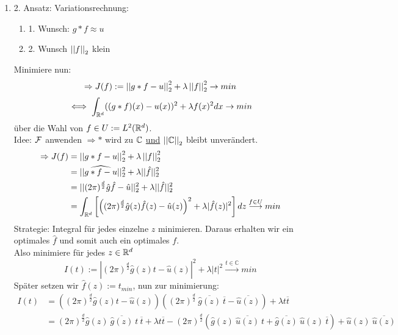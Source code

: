 \begin{enumerate}
\begin{minipage}[c]{0.4\textwidth}
\begin{center}
            \end{center}
        \end{minipage}
        \item[] 2. Ansatz: Variationsrechnung:
            \begin{enumerate}
                \item[] 1. Wunsch: $g *f \approx u$
                \item[] 2. Wunsch $\left\lvert \left\lvert f \right\rvert \right\rvert_2$ klein
            \end{enumerate}
            Minimiere nun:
            \[\Rightarrow J(f) := \left\lvert \left\lvert g * f - u \right\rvert \right\rvert_2^2 + \lambda \left\lvert \left\lvert f \right\rvert \right\rvert_2^2 \to min\]
            \[\iff \int_{\mathbb{R}^d} ((g*f)(x) - u(x))^2 + \lambda f(x)^2 dx \to min\]
            über die Wahl von $f \in U:= L^2(\mathbb{R}^d)$.\\
            Idee: $\mathcal{F}$ anwenden $\Rightarrow *$ wird zu $\mathbb{C}$ \underline{und} $\left\lvert \left\lvert \mathbb{C} \right\rvert \right\rvert_2$ bleibt unverändert.
            \begin{align*}
                \Rightarrow J(f)&=\left\lvert \left\lvert g*f-u \right\rvert \right\rvert_2^2 + \lambda\left\lvert \left\lvert f \right\rvert \right\rvert_2^2\\
                &=||\widehat{g*f-u}||_2^2 + \lambda ||\hat f||_2^2\\
                &=||(2 \pi)^\frac{d}{2} \hat g \hat f -\hat u||_2^2 + \lambda||\hat f||_2^2\\
                &=\int_{\mathbb{R}^d}\left[ \left((2 \pi)^\frac{d}{2} \hat g(z) \hat f(z) - \hat u(z)\right)^2 + \lambda |\hat f(z)|^2 \right] dz \overset{f \in U}{\longrightarrow} min
            \end{align*}
        Strategie: Integral für jedes einzelne $z$ minimieren. Daraus erhalten wir ein optimales $\hat f$ und somit auch ein optimales $f$.\\
        Also minimiere für jedes $z \in \mathbb{R}^d$
        \[I(t):=|(2 \pi)^\frac{d}{2} \hat g(z)t - \hat u(z)|^2 + \lambda |t|^2 \overset{t \in \mathbb C}{\longrightarrow}min\]
        Später setzen wir $\hat f(z):=t_{min}$, nun zur minimierung:
        \begin{align*}
            I(t)&=((2 \pi)^\frac{d}{2} \hat g(z) t - \hat u(z))((2 \pi)^\frac{d}{2} \ \overline{\hat g(z)} \ \overline t -\overline{\hat u (z)}) + \lambda t \overline t\\
            &=(2 \pi)^\frac{d}{2} \hat g(z) \ \overline{\hat g(z)} \ t \ \overline t + \lambda t \overline t - (2 \pi)^\frac{d}{2} (\hat g(z) \ \overline{\hat u(z)} \ t + \overline{\hat g(z)} \ \hat u(z) \ \overline{t}) + \hat u(z) \ \overline{\hat u(z)}\\

\end{align*}
\end{enumerate}
